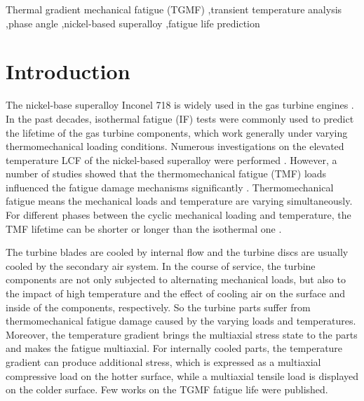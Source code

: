 \documentclass[preprint,5p,twocolumn,10pt,sort&compress]{elsarticle}
\begin{document}
\begin{frontmatter}
%
\begin{keyword}
Thermal gradient mechanical fatigue (TGMF) \sep transient temperature analysis \sep phase angle \sep nickel-based superalloy \sep fatigue life prediction

\end{keyword}
\end{frontmatter}

\section{Introduction}

The nickel-base superalloy Inconel 718 is widely used in the gas turbine engines \cite{Pollock2006}. In the past decades, isothermal fatigue (IF) tests were commonly used to predict the lifetime of the gas turbine components, which work generally under varying thermomechanical loading conditions. Numerous investigations on the elevated temperature LCF of the nickel-based superalloy were performed \cite{Koch85, Morrow88, Mahobia2014, Chen2016}. However, a number of studies showed that the thermomechanical fatigue (TMF) loads influenced the fatigue damage mechanisms significantly \cite{Evans2008, Bauer2009, Kulawinski2015, SCHLESINGER2017242, DENG2019813}. Thermomechanical fatigue means the mechanical loads and temperature are varying simultaneously. For different phases between the cyclic mechanical loading and temperature, the TMF lifetime can be shorter or longer than the isothermal one \cite{SUN2019228}.

The turbine blades are cooled by internal flow and the turbine discs are usually cooled by the secondary air system.
In the course of service, the turbine components are not only subjected to alternating  mechanical loads, but also to the impact of high temperature and the effect of cooling air on the surface and inside of the components, respectively. So the turbine parts suffer from thermomechanical fatigue damage caused by the varying loads and temperatures.
Moreover, the temperature gradient brings the multiaxial stress state to the parts and makes the fatigue multiaxial.
For internally cooled parts, the temperature gradient can produce additional stress, which is expressed as a multiaxial compressive load on the hotter surface, while a multiaxial tensile load is displayed on the colder surface.
Few works on the TGMF fatigue life were published.
\end{document}
